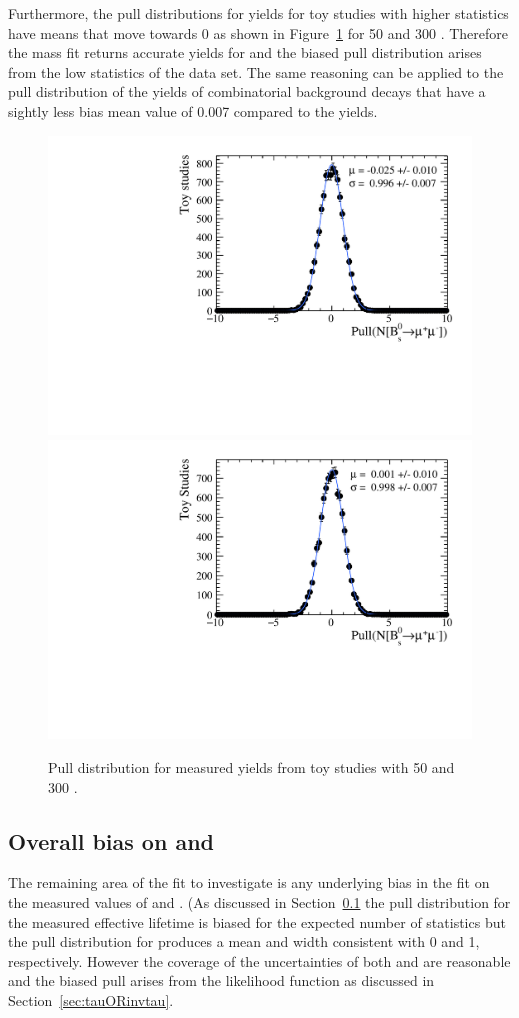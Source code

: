 Furthermore, the pull distributions for \bsmumu yields for toy studies with higher statistics have means that move towards 0 as shown in Figure~\ref{fig:BsmumuYieldPulls} for 50 and 300 \fb. Therefore the mass fit returns accurate yields for \bsmumu and the biased pull distribution arises from the low statistics of the data set. The same reasoning can be applied to the pull distribution of the yields of combinatorial background decays that have a sightly less bias mean value of 0.007 compared to the \bsmumu yields.

\begin{figure}[htbp]
    \centering
        \includegraphics[width=0.49 \textwidth]{./Figs/LifetimeSystematics/Bs2MuMu_yield_pull_50fb.pdf}
        \includegraphics[width=0.49 \textwidth]{./Figs/LifetimeSystematics/Bs2MuMu_yield_pull_300fb.pdf}
    \caption{Pull distribution for \bsmumu measured yields from toy studies with 50 and 300 \fb.}
    \label{fig:BsmumuYieldPulls}
\end{figure}


\subsection{Overall bias on \tmumu and \Gmumu}
The remaining area of the fit to investigate is any underlying bias in the fit on the measured values of \tmumu and \Gmumu. (As discussed in Section~\ref{} the pull distribution for the measured effective lifetime is biased for the expected number of statistics but the pull distribution for \Gmumu produces a mean and width consistent with 0 and 1, respectively. However the coverage of the uncertainties of both \mmumu and \Gmumu are reasonable and the biased \tmumu pull arises from the likelihood function as discussed in Section~\ref{sec:tauORinvtau}. 

